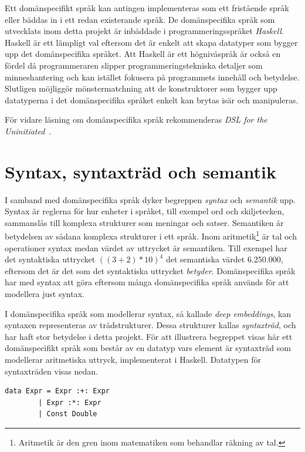Ett domänspecifikt språk kan antingen implementeras som ett fristående språk
eller bäddas in i ett redan existerande språk. De domänspecifika språk som
utvecklats inom detta projekt är inbäddade i programmeringsspråket
\textit{Haskell}. Haskell är ett lämpligt val eftersom det är enkelt att skapa
datatyper som bygger upp det domänspecifika språket. Att Haskell är ett
högnivåspråk är också en fördel då programmeraren slipper programmeringstekniska detaljer som
minneshantering och kan istället fokusera på programmets innehåll
och betydelse. Slutligen möjliggör mönstermatchning att de konstruktorer som bygger
upp datatyperna i det domänspecifika språket enkelt kan brytas isär och manipuleras.

För vidare läsning om domänspecifika språk rekommenderas \textit{DSL for the Uninitiated}~\cite{DSLU}.

\section{Syntax, syntaxträd och semantik}\label{sec:syntax}

I samband med domänspecifika språk dyker begreppen \textit{syntax} och
\textit{semantik} upp. Syntax är reglerna för hur enheter i språket, till exempel ord och skiljetecken, sammanslås till komplexa strukturer som meningar och
satser. Semantiken är betydelsen av sådana komplexa strukturer i ett språk.
Inom aritmetik\footnote{Aritmetik är
  den gren inom matematiken som behandlar räkning av tal.} är tal och
operationer syntax medan värdet av uttrycket är semantiken.  Till
exempel har det syntaktiska uttrycket $((3 + 2) * 10)^4$ det semantiska värdet $6.250.000$,
eftersom det är det som det syntaktiska uttrycket \textit{betyder}.
Domänspecifika språk har med syntax att göra eftersom många
domänspecifika språk används för att modellera just syntax.

I domänspecifika språk som modellerar syntax, så kallade \textit{deep
embeddings}, kan syntaxen representeras av trädstrukturer. Dessa
strukturer kallas \textit{syntaxträd}, och har haft stor betydelse i detta projekt.
För att illustrera begreppet visas här ett domänspecifikt språk som består av en
datatyp vars element är
syntaxträd som modellerar aritmetiska uttryck, implementerat i Haskell.
Datatypen för syntaxträden visas nedan.

\begin{lstlisting}
data Expr = Expr :+: Expr
        | Expr :*: Expr
        | Const Double
\end{lstlisting}

